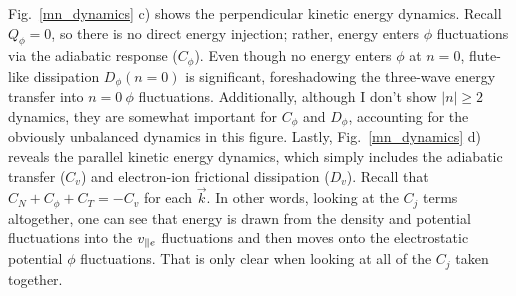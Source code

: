 Fig.~\ref{mn_dynamics} c) shows the perpendicular kinetic energy dynamics. Recall $Q_\phi = 0$, so there is no direct energy injection; rather, energy enters $\phi$ fluctuations via the adiabatic
response ($C_\phi$). Even though no energy enters $\phi$ at $n=0$, flute-like dissipation $D_\phi(n=0)$ is significant, foreshadowing the three-wave energy transfer into $n=0 \ \phi$ 
fluctuations. Additionally, although I don't show $|n| \ge 2$ dynamics, they are somewhat important for $C_\phi$ and $D_\phi$, accounting for the obviously unbalanced dynamics in this figure.
Lastly, Fig.~\ref{mn_dynamics} d) reveals the parallel kinetic energy dynamics, which simply includes the adiabatic transfer ($C_v$) and electron-ion frictional dissipation ($D_v$). Recall that
$C_N + C_\phi + C_T = - C_v$ for each $\vec{k}$. In other words, looking at the $C_j$ terms altogether,
one can see that energy is drawn from the density and potential fluctuations into the $v_{\parallel e}$ fluctuations and then moves onto the electrostatic potential $\phi$
fluctuations. That is only clear when looking at all of the $C_j$ taken together.

